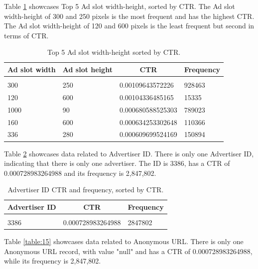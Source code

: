 \documentclass{article} %
\begin{document}
Table \ref{table:13} showcases Top 5 Ad slot width-height, sorted by CTR. The Ad slot width-height of 300 and 250 pixels is the most frequent and has the highest CTR. The Ad slot width-height of 120 and 600 pixels is the least frequent but second in terms of CTR.

\begin{table}[!htbp]
\caption{Top 5 Ad slot width-height sorted by CTR.}
\label{table:13}
\begin{center}
\begin{tabular}{l l l l}
\multicolumn{1}{c}{\bf Ad slot width} & \multicolumn{1}{c}{\bf Ad slot height} & \multicolumn{1}{c}{\bf CTR} & \multicolumn{1}{c}{\bf Frequency}
\\ \hline \\
300  & 250 & 0.00109643572226  & 928463\\
120  & 600 & 0.00104336485165  & 15335\\
1000 & 90  & 0.000680588525303 & 789023\\
160  & 600 & 0.000634253302648 & 110366\\
336  & 280 & 0.000609699524169 & 150894\\
\end{tabular}
\end{center}
\end{table}

Table \ref{table:14} showcases data related to Advertiser ID. There is only one Advertiser ID, indicating that there is only one advertiser. The ID is 3386, has a CTR of 0.000728983264988 and its frequency is 2,847,802.

\begin{table}[!htbp]
\caption{Advertiser ID CTR and frequency, sorted by CTR.}
\label{table:14}
\begin{center}
\begin{tabular}{l l l}
\multicolumn{1}{c}{\bf Advertiser ID} & \multicolumn{1}{c}{\bf CTR} & \multicolumn{1}{c}{\bf Frequency}
\\ \hline \\
3386 & 0.000728983264988 & 2847802\\
\end{tabular}
\end{center}
\end{table}

Table \ref{table:15} showcases data related to Anonymous URL. There is only one Anonymous URL record, with value "null" and has a CTR of 0.000728983264988, while its frequency is 2,847,802.
\end{document}
